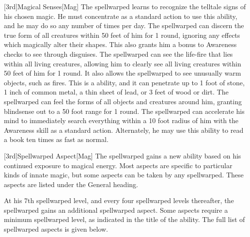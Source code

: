         [3rd]{Magical Senses}[Mag]
        The spellwarped learns to recognize the telltale signs of his chosen magic.
        He must concentrate as a standard action to use this ability, and he may do so any number of times per day.
        The spellwarped can discern the true form of all creatures within 50 feet of him for 1 round, ignoring any effects which magically alter their shapes.
        This also grants him a  bonus to Awareness checks to see through disguises.
        The spellwarped can see the life-fire that lies within all living creatures, allowing him to clearly see all living creatures within 50 feet of him for 1 round.
        It also allows the spellwarped to see unusually warm objects, such as fires.
        This is a  ability, and it can penetrate up to 1 foot of stone, 1 inch of common metal, a thin sheet of lead, or 3 feet of wood or dirt.
        The spellwarped can feel the forms of all objects and creatures around him, granting blindsense out to a 50 foot range for 1 round.
        The spellwarped can accelerate his mind to immediately search everything within a 10 foot radius of him with the Awareness skill as a standard action.
        Alternately, he may use this ability to read a book ten times as fast as normal.

        [3rd]{Spellwarped Aspect}[Mag]
        The spellwarped gains a new ability based on his continued exposure to magical energy.
        Most aspects are specific to particular kinds of innate magic, but some aspects can be taken by any spellwarped.
        These aspects are listed under the General heading.

        At his 7th spellwarped level, and every four spellwarped levels thereafter, the spellwarped gains an additional spellwarped aspect.
        Some aspects require a minimum spellwarped level, as indicated in the title of the ability.
        The full list of spellwarped aspects is given below.


